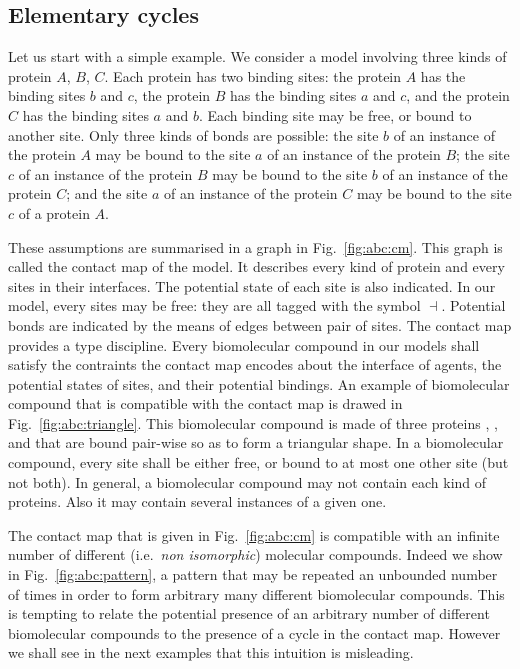 \documentclass{entcs}
\newcommand{\freesymbol}{\dashv}
\begin{document}
\subsection{Elementary cycles}

Let us start with a simple example. We consider a model involving three kinds of protein $A$, $B$, $C$. Each protein has two binding sites: the protein $A$ has the binding sites $b$ and $c$, the protein $B$ has the binding sites $a$ and $c$, and the protein $C$ has the binding sites $a$ and $b$. Each binding site may be free, or bound to another site. Only three kinds of bonds are possible: the site $b$ of an instance of the protein $A$ may be bound to the site $a$ of an instance of the protein $B$; the site $c$ of an instance of the  protein $B$ may be bound to the site $b$ of an instance of the protein $C$; and the site $a$ of an instance of the protein $C$ may be bound to the site $c$ of a protein $A$.

These assumptions are summarised in a graph in Fig.~\ref{fig:abc:cm}. This graph is called the contact map of the model. It describes every kind of protein and every sites in their interfaces. The potential state of each site is also indicated. In our model, every sites may be free: they are all tagged with the symbol $\freesymbol$. Potential bonds are indicated by the means of edges between pair of sites.  The contact map provides a type discipline.
Every biomolecular compound in our models shall satisfy the contraints the contact map encodes about the interface of agents, the potential states of sites, and their potential bindings. An example of biomolecular compound that is compatible with the contact map is drawed in Fig.~\ref{fig:abc:triangle}. This biomolecular compound is made of three proteins , , and  that are bound pair-wise so as to form a triangular shape.
In a biomolecular compound, every site shall be either free, or bound to at most one other site (but not both). In general, a biomolecular compound may not contain each kind of proteins. Also it may contain several instances of a given one.

The contact map that is given in Fig.~\ref{fig:abc:cm} is compatible with an infinite number of different (i.e.~\emph{non isomorphic}) molecular compounds.
Indeed we show in Fig.~\ref{fig:abc:pattern}, a pattern
that may be repeated an unbounded number of times in order to form arbitrary many different biomolecular compounds. This is tempting to relate the potential presence of an arbitrary number of different biomolecular compounds to the presence of a cycle in the contact map. However we shall see in the next examples that this intuition is misleading.
\end{document}
